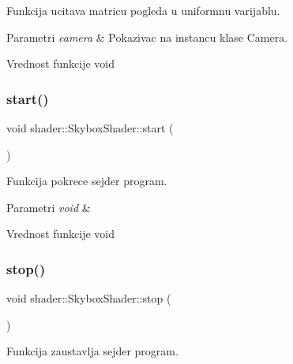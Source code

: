 Funkcija ucitava matricu pogleda u uniformnu varijablu. 


\begin{DoxyParams}{Parametri}
{\em camera} & Pokazivac na instancu klase Camera. \\
\hline
\end{DoxyParams}
\begin{DoxyReturn}{Vrednost funkcije}
void 
\end{DoxyReturn}
\mbox{\label{classshader_1_1SkyboxShader_aafcfd5c65e11b80953a8ba9645b0e2bf}} 
\subsubsection{\texorpdfstring{start()}{start()}}
{\footnotesize\ttfamily void shader\+::\+Skybox\+Shader\+::start (\begin{DoxyParamCaption}\item[{void}]{ }\end{DoxyParamCaption})}



Funkcija pokrece sejder program. 


\begin{DoxyParams}{Parametri}
{\em void} & \\
\hline
\end{DoxyParams}
\begin{DoxyReturn}{Vrednost funkcije}
void 
\end{DoxyReturn}
\mbox{\label{classshader_1_1SkyboxShader_a81d50b999a376fcd9cbbc20faa79df60}} 
\subsubsection{\texorpdfstring{stop()}{stop()}}
{\footnotesize\ttfamily void shader\+::\+Skybox\+Shader\+::stop (\begin{DoxyParamCaption}\item[{void}]{ }\end{DoxyParamCaption})}



Funkcija zaustavlja sejder program. 



